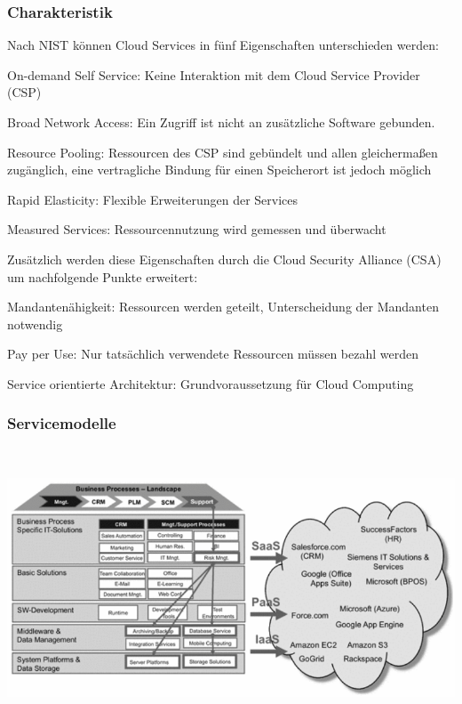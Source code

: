 \documentclass[12pt,a4paper,bibliography=totocnumbered,listof=totocnumbered]{scrartcl}
\begin{document}
\subsubsection{Charakteristik}
Nach NIST \cite{34} können Cloud Services in fünf Eigenschaften unterschieden werden:
\begin{compactitem}
	\item On-demand Self Service: Keine Interaktion mit dem Cloud Service Provider (CSP)
	\item Broad Network Access: Ein Zugriff ist nicht an zusätzliche Software gebunden.
	\item Resource Pooling: Ressourcen des CSP sind gebündelt und allen gleichermaßen zugänglich, eine vertragliche Bindung für einen Speicherort ist jedoch möglich
	\item Rapid Elasticity: Flexible Erweiterungen der Services
	\item Measured Services: Ressourcennutzung wird gemessen und überwacht
\end{compactitem}

Zusätzlich werden diese Eigenschaften durch die Cloud Security Alliance (CSA) \cite{36} um nachfolgende Punkte erweitert:
\begin{compactitem}
	\item Mandantenähigkeit: Ressourcen werden geteilt, Unterscheidung der Mandanten notwendig
	\item Pay per Use: Nur tatsächlich verwendete Ressourcen müssen bezahl werden
	\item Service orientierte Architektur: Grundvoraussetzung für Cloud Computing
\end{compactitem}

\subsubsection{Servicemodelle}

\vspace{1em}
$\;$\\
\begin{minipage}{\linewidth}
	\centering
	\includegraphics[width=1.0\linewidth]{IaaS_Modelle.png}
\end{minipage}
\vspace{1em}
\end{document}
